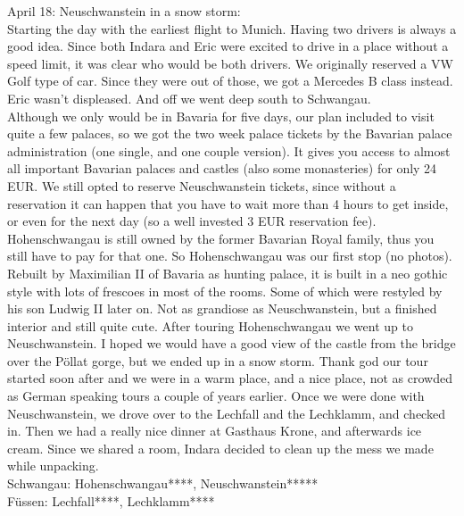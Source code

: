 April 18: Neuschwanstein in a snow storm:\\
Starting the day with the earliest flight to Munich. Having two drivers is always a good idea. Since both Indara and Eric were excited to drive in a place without a speed limit, it was clear who would be both drivers. We originally reserved a VW Golf type of car. Since they were out of those, we got a Mercedes B class instead. Eric wasn't displeased. And off we went deep south to Schwangau.\\
 Although we only would be in Bavaria for five days, our plan included to visit quite a few palaces, so we got the two week palace tickets by the Bavarian palace administration (one single, and one couple version). It gives you access to almost all important Bavarian palaces and castles (also some monasteries) for only 24 EUR. We still opted to reserve Neuschwanstein tickets, since without a reservation it can happen that you have to wait more than 4 hours to get inside, or even for the next day (so a well invested 3 EUR reservation fee). Hohenschwangau is still owned by the former Bavarian Royal family, thus you still have to pay for that one. So Hohenschwangau was our first stop (no photos). Rebuilt by Maximilian II of Bavaria as hunting palace, it is built in a neo gothic style with lots of frescoes in most of the rooms. Some of which were restyled by his son Ludwig II later on. Not as grandiose as Neuschwanstein, but a finished interior and still quite cute. After touring Hohenschwangau we went up to Neuschwanstein. I hoped we would have a good view of the castle from the bridge over the P\"ollat gorge, but we ended up in a snow storm. Thank god our tour started soon after and we were in a warm place, and a nice place, not as crowded as German speaking tours a couple of years earlier. Once we were done with Neuschwanstein, we drove over to the Lechfall and the Lechklamm, and checked in. Then we had a really nice dinner at Gasthaus Krone, and afterwards ice cream. Since we shared a room, Indara decided to clean up the mess we made while unpacking.\\

Schwangau: Hohenschwangau****, Neuschwanstein*****\\
F\"ussen: Lechfall****, Lechklamm****\\

